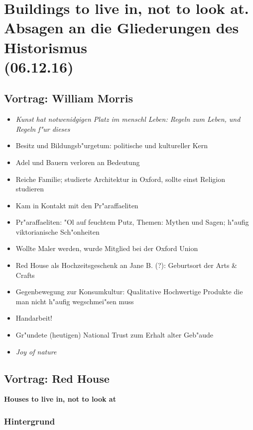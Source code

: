 \documentclass[emulatestandardclasses]{scrartcl}
\begin{document}
\section{Buildings to live in, not to look at. Absagen an die Gliederungen des Historismus\\(06.12.16)}


\subsection{Vortrag: William Morris}

\begin{itemize}
  \item \emph{Kunst hat notwenidgigen Platz im menschl Leben: Regeln zum Leben, und Regeln f"ur dieses}
  \item Besitz und Bildungsb"urgetum: politische und kultureller Kern
  \item Adel und Bauern verloren an Bedeutung
  \item Reiche Familie; studierte Architektur in Oxford, sollte einst Religion studieren
  \item Kam in Kontakt mit den Pr"araffaeliten
  \item Pr"araffaeliten: "Ol auf feuchtem Putz, Themen: Mythen und Sagen; h"aufig viktorianische Sch"onheiten
  \item Wollte Maler werden, wurde Mitglied bei der Oxford Union
  \item Red House als Hochzeitsgeschenk an Jane B. (?): Geburtsort der Arts \& Crafts
  \item Gegenbewegung zur Konsumkultur: Qualitative Hochwertige Produkte die man nicht h"aufig wegschmei"sen muss
  \item Handarbeit!
  \item Gr"undete (heutigen) National Trust zum Erhalt alter Geb"aude
  \item \emph{Joy of nature}
\end{itemize}


\subsection{Vortrag: Red House}

\textbf{Houses to live in, not to look at}

\subsubsection{Hintergrund}
\end{document}
